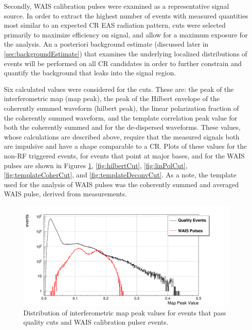 	Secondly, WAIS calibration pulses were examined as a representative signal source.  In order to extract the highest number of events with measured quantities most similar to an expected CR EAS radiation pattern, cuts were selected primarily to maximize efficiency on signal, and allow for a maximum exposure for the analysis.  An a posteriori background estimate (discussed later in \autoref{sec:backgroundEstimate}) that examines the underlying localized distributions of events will be performed on all CR candidates in order to further constrain and quantify the background that leaks into the signal region.
	
	Six calculated values were considered for the cuts.  These are: the peak of the interferometric map (map peak), the peak of the Hilbert envelope of the coherently summed waveform (hilbert peak), the linear polarization fraction of the coherently summed waveform, and the template correlation peak value for both the coherently summed and for the de-dispersed waveforms.  These values, whose calculations are described above, require that the measured signals both are impulsive and have a shape comparable to a CR.  Plots of these values for the non-RF triggered events, for events that point at major bases, and for the WAIS pulses are shown in Figures \ref{fig:mapPeakCut}, \ref{fig:hilbertCut}, \ref{fig:linPolCut}, \ref{fig:templateCoherCut}, and \ref{fig:templateDeconvCut}.  As a note, the template used for the analysis of WAIS pulses was the coherently summed and averaged WAIS pulse, derived from measurements.
	
	
\begin{figure}
	\centering
	\includegraphics[width=\textwidth]{figures/mapPeakCut}
	\caption{Distribution of interferometric map peak values for events that pass quality cuts and WAIS calibration pulser events.} 
	\label{fig:mapPeakCut}
\end{figure}
	
